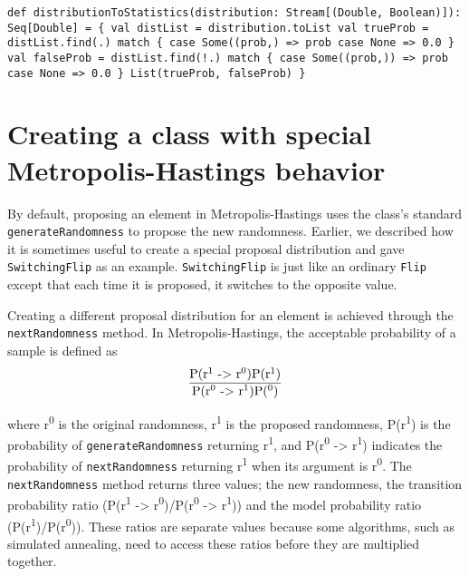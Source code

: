 \begin{flushleft}
\texttt{def distributionToStatistics(distribution: Stream[(Double, Boolean)]): Seq[Double] = \{
\newline \tab val distList = distribution.toList
\newline \tab val trueProb = 
\newline \tab \tab distList.find(\textunderscore.) match \{
\newline \tab \tab \tab case Some((prob,\textunderscore) => prob
\newline \tab \tab \tab case None => 0.0
\newline \tab \tab \}
\newline \tab val falseProb = 
\newline \tab \tab distList.find(!\textunderscore.) match \{
\newline \tab \tab \tab case Some((prob,\textunderscore)) => prob
\newline \tab \tab \tab case None => 0.0
\newline \tab \tab \} 
\newline \tab List(trueProb, falseProb)
\newline \}
}
\end{flushleft}

\section{Creating a class with special Metropolis-Hastings behavior}

By default, proposing an element in Metropolis-Hastings uses the class's standard \texttt{generateRandomness} to propose the new randomness. Earlier, we described how it is sometimes useful to create a special proposal distribution and gave \texttt{SwitchingFlip} as an example. \texttt{SwitchingFlip} is just like an ordinary \texttt{Flip} except that each time it is proposed, it switches to the opposite value.

Creating a different proposal distribution for an element is achieved through the \texttt{nextRandomness} method. In Metropolis-Hastings, the acceptable probability of a sample is defined as
\[\frac{\text{P(r\textsuperscript{1} -> r\textsuperscript{0})P(r\textsuperscript{1})}}{\text{P(r\textsuperscript{0} -> r\textsuperscript{1})P(\textsuperscript{0})}}\]

where r\textsuperscript{0} is the original randomness, r\textsuperscript{1} is the proposed randomness, P(r\textsuperscript{1}) is the probability of \texttt{generateRandomness} returning r\textsuperscript{1}, and P(r\textsuperscript{0} -> r\textsuperscript{1}) indicates the probability of \texttt{nextRandomness} returning r\textsuperscript{1} when its argument is r\textsuperscript{0}. The \texttt{nextRandomness} method returns three values; the new randomness, the transition probability ratio (P(r\textsuperscript{1} -> r\textsuperscript{0})/P(r\textsuperscript{0} -> r\textsuperscript{1})) and the model probability ratio (P(r\textsuperscript{1})/P(r\textsuperscript{0})). These ratios are separate values because some algorithms, such as simulated annealing, need to access these ratios before they are multiplied together.

